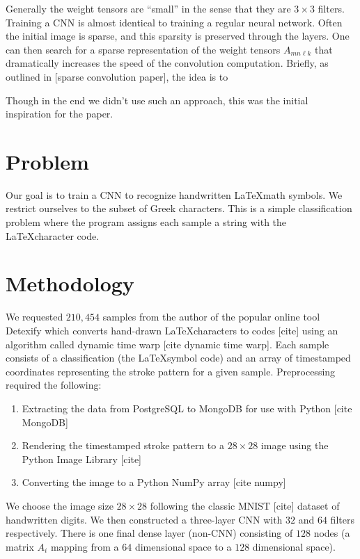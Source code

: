 \documentclass[12pt,letterpaper,boxed]{article}
\begin{document}
Generally the weight tensors are ``small'' in the sense that they are $3\times3$ filters. Training a CNN is almost identical to training a regular neural network. Often the initial image is sparse, and this sparsity is preserved through the layers. One can then search for a sparse representation of the weight tensors $A_{mn \ell k}$ that dramatically increases the speed of the convolution computation. Briefly, as outlined in [sparse convolution paper], the idea is to 


Though in the end we didn't use such an approach, this was the initial inspiration for the paper.

\section{Problem}
	Our goal is to train a CNN to recognize handwritten \LaTeX math symbols. We restrict ourselves to the subset of Greek characters. This is a simple classification problem where the program assigns each sample a string with the \LaTeX character code.

\section{Methodology}
		We requested $210,454$ samples from the author of the popular online tool Detexify which converts hand-drawn \LaTeX characters to codes [cite] using an algorithm called dynamic time warp [cite dynamic time warp]. Each sample consists of a classification (the \LaTeX symbol code) and an array of timestamped coordinates representing the stroke pattern for a given sample. Preprocessing required the following:
		\begin{enumerate}
			\item Extracting the data from PostgreSQL to MongoDB for use with Python [cite MongoDB]
			\item Rendering the timestamped stroke pattern to a $28\times28$ image using the Python Image Library [cite]
			\item Converting the image to a Python NumPy array [cite numpy]
		\end{enumerate}
		
		We choose the image size $28\times28$ following the classic MNIST [cite] dataset of handwritten digits. We then constructed a three-layer CNN with $32$ and $64$ filters respectively. There is one final dense layer (non-CNN) consisting of $128$ nodes (a matrix $A_i$ mapping from a $64$ dimensional space to a $128$ dimensional space).
		
\end{document}
